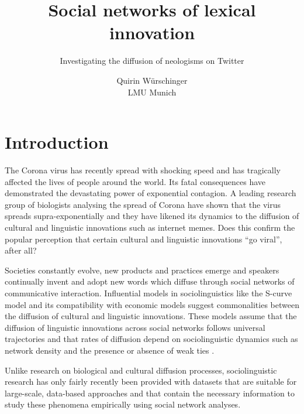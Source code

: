 \documentclass[
  a4paper,
  ]{scrartcl}
\begin{document}

  \title{Social networks of lexical innovation}
  \subtitle{Investigating the diffusion of neologisms on Twitter}
  \author{Quirin Würschinger\\ LMU Munich}
  \maketitle

\listoftodos

\tableofcontents


  \cleardoublepage

\section{Introduction}

  The Corona virus has recently spread with shocking speed and has tragically affected the lives of people around the world. Its fatal consequences have demonstrated the devastating power of exponential contagion.  A leading research group of biologists analysing the spread of Corona have shown that the virus spreads supra-exponentially and they have likened its dynamics to the diffusion of cultural and linguistic innovations such as internet memes. \parencite{EandT2020} Does this confirm the popular perception that certain cultural and linguistic innovations \enquote{go viral}, after all?

  Societies constantly evolve, new products and practices emerge and speakers continually invent and adopt new words which diffuse through social networks of communicative interaction. Influential models in sociolinguistics like the S-curve model \parencite{Milroy1992} and its compatibility with economic models \parencite{Rogers1962} suggest commonalities between the diffusion of cultural and linguistic innovations. These models assume that the diffusion of linguistic innovations across social networks follows universal trajectories and that rates of diffusion depend on sociolinguistic dynamics such as network density and the presence or absence of weak ties \parencite{Granovetter1977}.

  Unlike research on biological and cultural diffusion processes, sociolinguistic research has only fairly recently been provided with datasets that are suitable for large-scale, data-based approaches and that contain the necessary information to study these phenomena empirically using social network analyses.
\end{document}
